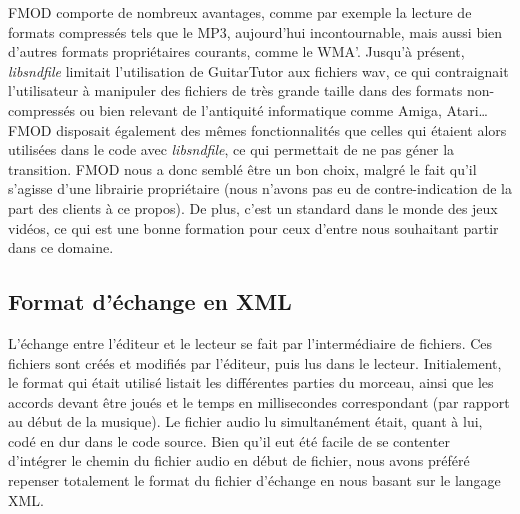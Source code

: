 FMOD comporte de nombreux avantages, comme par exemple la lecture de formats compressés tels que le MP3, aujourd'hui incontournable, mais aussi bien d'autres formats propriétaires courants, comme le WMA'.
Jusqu'à présent, \textit{libsndfile} limitait l'utilisation de GuitarTutor aux fichiers wav, ce qui contraignait l'utilisateur à manipuler des fichiers de très grande taille dans des formats non-compressés ou bien relevant de l'antiquité informatique comme Amiga, Atari\dots FMOD disposait également des mêmes fonctionnalités que celles qui étaient alors utilisées dans le code avec \textit{libsndfile}, ce qui permettait de ne pas géner la transition. FMOD nous a donc semblé être un bon choix, malgré le fait qu'il s'agisse d'une librairie propriétaire (nous n'avons pas eu de contre-indication de la part des clients à ce propos).
De plus, c'est un standard dans le monde des jeux vidéos, ce qui est une bonne formation pour ceux d'entre nous souhaitant partir dans ce domaine.


\subsection{Format d'échange en XML}
\label{xml}

L'échange entre l'éditeur et le lecteur se fait par l'intermédiaire de fichiers. Ces fichiers sont créés et modifiés par l'éditeur, puis lus dans le lecteur. Initialement, le format qui était utilisé listait les différentes parties du morceau, ainsi que les accords devant être joués et le temps en millisecondes correspondant (par rapport au début de la musique). Le fichier audio lu simultanément était, quant à lui, codé en dur dans le code source. Bien qu'il eut été facile de se contenter d'intégrer le chemin du fichier audio en début de fichier, nous avons préféré repenser totalement le format du fichier d'échange en nous basant sur le langage XML.

